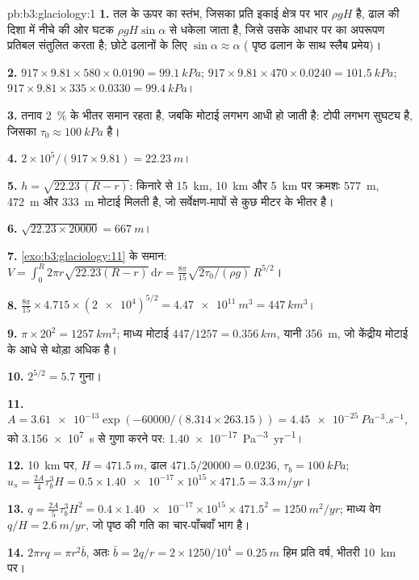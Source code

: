 \begin{solution}{pb:b3:glaciology:1}
\textbf{1.} तल के ऊपर का स्तंभ, जिसका प्रति इकाई क्षेत्र पर भार $\rho gH$ है,
ढाल की दिशा में नीचे की ओर घटक $\rho gH\sin\alpha$ से धकेला जाता है, जिसे
उसके आधार पर का अपरूपण प्रतिबल संतुलित करता है; छोटे ढलानों के लिए $\sin\alpha \approx \alpha$ (
पृष्ठ ढलान के साथ स्लैब प्रमेय)।

\textbf{2.} $917\times9.81\times580\times0.0190 = \qty{99.1}{kPa}$;
$917\times9.81\times470\times0.0240 = \qty{101.5}{kPa}$; $917\times9.81
\times335\times0.0330 = \qty{99.4}{kPa}$।

\textbf{3.} तनाव \qty{2}{\percent} के भीतर समान रहता है, जबकि
मोटाई लगभग आधी हो जाती है: टोपी लगभग सुघट्य है, जिसका $\tau_0 \approx
\qty{100}{kPa}$ है।

\textbf{4.} $2\times10^5/(917\times9.81) = \qty{22.23}{m}$।

\textbf{5.} $h = \sqrt{22.23\,(R - r)}$: किनारे से \qty{15}{km}, \qty{10}{km} और \qty{5}{km} पर क्रमशः \qty{577}{m}, \qty{472}{m} और
\qty{333}{m} मोटाई मिलती है, जो
सर्वेक्षण-मापों से कुछ मीटर के भीतर है।

\textbf{6.} $\sqrt{22.23\times20000} = \qty{667}{m}$।

\textbf{7.} \cref{exo:b3:glaciology:11} के समान: $V = \int_0^R2\pi r
\sqrt{22.23(R - r)}\,\mathrm dr = \frac{8\pi}{15}\sqrt{2\tau_0/(\rho
g)}\,R^{5/2}$।

\textbf{8.} $\frac{8\pi}{15}\times4.715\times(\num{2e4})^{5/2} =
\qty{4.47e11}{m^3} = \qty{447}{km^3}$।

\textbf{9.} $\pi\times20^2 = \qty{1257}{km^2}$; माध्य मोटाई
$447/1257 = \qty{0.356}{km}$, यानी \qty{356}{m}, जो
केंद्रीय मोटाई के आधे से थोड़ा अधिक है।

\textbf{10.} $2^{5/2} = 5.7$ गुना।

\textbf{11.} $A = \num{3.61e-13}\exp(-60000/(8.314\times263.15)) =
\qty{4.45e-25}{Pa^{-3}.s^{-1}}$, को \qty{3.156e7}{s} से गुणा करने पर:
\qty{1.40e-17}{Pa^{-3}.yr^{-1}}।

\textbf{12.} \qty{10}{km} पर, $H = \qty{471.5}{m}$, ढाल $471.5/20000 =
\num{0.0236}$, $\tau_b = \qty{100}{kPa}$; $u_s = \tfrac{2A}{4}\tau_b^3H =
0.5\times\num{1.40e-17}\times10^{15}\times471.5 = \qty{3.3}{m/yr}$।

\textbf{13.} $q = \tfrac{2A}{5}\tau_b^3H^2 = 0.4\times\num{1.40e-17}
\times10^{15}\times471.5^2 = \qty{1250}{m^2/yr}$; माध्य वेग $q/H =
\qty{2.6}{m/yr}$, जो पृष्ठ की गति का चार-पाँचवाँ भाग है।

\textbf{14.} $2\pi rq = \pi r^2\bar b$, अतः $\bar b = 2q/r = 2\times1250/10^4
= \qty{0.25}{m}$ हिम प्रति वर्ष, भीतरी \qty{10}{km} पर।


\end{solution}
